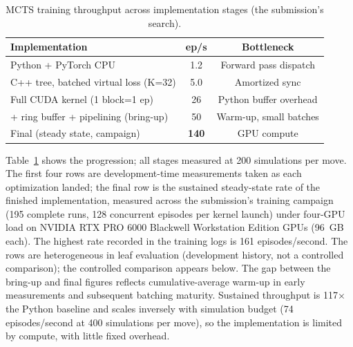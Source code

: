 \documentclass[journal]{IEEEtran}
\begin{document}
\begin{table}[t]
\centering
\caption{MCTS training throughput across implementation stages (the submission's search).}
\label{tab:throughput}
\begin{tabular}{lcc}
\toprule
Implementation & ep/s & Bottleneck \\
\midrule
Python + PyTorch CPU & 1.2 & Forward pass dispatch \\
C++ tree, batched virtual loss (K=32) & 5.0 & Amortized sync \\
Full CUDA kernel (1 block=1 ep) & 26 & Python buffer overhead \\
+ ring buffer + pipelining (bring-up) & 50 & Warm-up, small batches \\
Final (steady state, campaign) & \textbf{140} & GPU compute \\
\bottomrule
\end{tabular}
\end{table}

Table~\ref{tab:throughput} shows the progression; all stages measured at 200 simulations per move. The first four rows are development-time measurements taken as each optimization landed; the final row is the sustained steady-state rate of the finished implementation, measured across the submission's training campaign (195 complete runs, 128 concurrent episodes per kernel launch) under four-GPU load on NVIDIA RTX PRO 6000 Blackwell Workstation Edition GPUs (96~GB each). The highest rate recorded in the training logs is 161 episodes/second. The rows are heterogeneous in leaf evaluation (development history, not a controlled comparison); the controlled comparison appears below. The gap between the bring-up and final figures reflects cumulative-average warm-up in early measurements and subsequent batching maturity. Sustained throughput is 117$\times$ the Python baseline and scales inversely with simulation budget (74 episodes/second at 400 simulations per move), so the implementation is limited by compute, with little fixed overhead.
\end{document}
